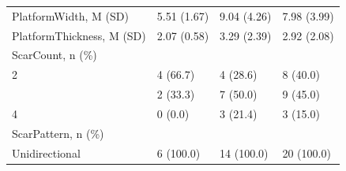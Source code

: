 \documentclass[12pt,twoside]{reedthesis}
\begin{document}
\begin{longtable}[t]{llll}
PlatformWidth, M (SD) & 5.51 (1.67) & 9.04 (4.26) & 7.98 (3.99)\\
PlatformThickness, M (SD) & 2.07 (0.58) & 3.29 (2.39) & 2.92 (2.08)\\
ScarCount, n (\%) &  &  & \\
2 & 4 (66.7) & 4 (28.6) & 8 (40.0)\\
\addlinespace
3 & 2 (33.3) & 7 (50.0) & 9 (45.0)\\
4 & 0 (0.0) & 3 (21.4) & 3 (15.0)\\
ScarPattern, n (\%) &  &  & \\
Unidirectional & 6 (100.0) & 14 (100.0) & 20 (100.0)\\
\bottomrule
\end{longtable}
\begin{table}

\caption{\label{tab:unnamed-chunk-79}Terminal Gravettinan Elongated product measurements (width, length and thickness) with mean and standard deviation values.}
\centering
{}
\end{table}
\begin{table}

\caption{\label{tab:unnamed-chunk-80}Proto-Solutrean Elongated product measurements (width, length and thickness) with mean and standard deviation values.}
\centering
{}
\end{table}

\end{document}
